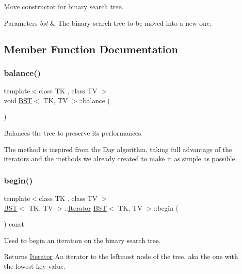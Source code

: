 Move constructor for binary search tree. 


\begin{DoxyParams}{Parameters}
{\em bst} & The binary search tree to be moved into a new one. \\
\hline
\end{DoxyParams}


\subsection{Member Function Documentation}
\mbox{\label{classBST_a812b874214dac2bc44cbd20144d03533}} 
\subsubsection{\texorpdfstring{balance()}{balance()}}
{\footnotesize\ttfamily template$<$class TK , class TV $>$ \\
void \hyperlink{classBST}{B\+ST}$<$ TK, TV $>$\+::balance (\begin{DoxyParamCaption}{ }\end{DoxyParamCaption})}



Balances the tree to preserve its performances. 

The method is inspired from the Day algorithm, taking full advantage of the iterators and the methods we already created to make it as simple as possible. \mbox{\label{classBST_a627f8f8fa85960bd6a52175b42d66d56}} 
\subsubsection{\texorpdfstring{begin()}{begin()}}
{\footnotesize\ttfamily template$<$class TK , class TV $>$ \\
\hyperlink{classBST}{B\+ST}$<$ TK, TV $>$\+::\hyperlink{classBST_1_1Iterator}{Iterator} \hyperlink{classBST}{B\+ST}$<$ TK, TV $>$\+::begin (\begin{DoxyParamCaption}{ }\end{DoxyParamCaption}) const}



Used to begin an iteration on the binary search tree. 

\begin{DoxyReturn}{Returns}
\hyperlink{classBST_1_1Iterator}{Iterator} An iterator to the leftmost node of the tree. aka the one with the lowest key value. 
\end{DoxyReturn}
\mbox{\label{classBST_a58c42a2fc86f0ed09f5d7a43b30d7704}} 
